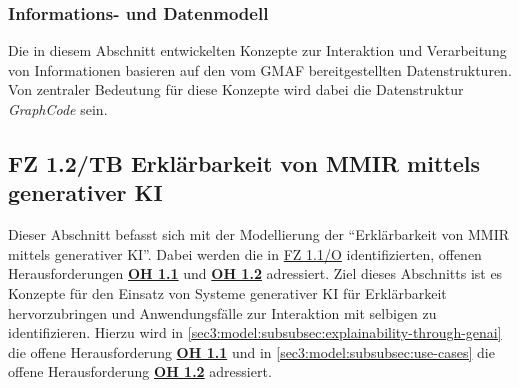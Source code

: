 \subsubsection{Informations- und Datenmodell}
Die in diesem Abschnitt entwickelten Konzepte zur Interaktion und Verarbeitung von Informationen basieren auf den vom GMAF bereitgestellten Datenstrukturen.
Von zentraler Bedeutung für diese Konzepte wird dabei die Datenstruktur \textit{GraphCode} sein.

\clearpage

\subsection[FZ 1.2/TB Erklärbarkeit von MMIR mittels generativer KI]{\texorpdfstring{FZ 1.2/TB Erklärbarkeit von MMIR mittels \\ generativer KI}{FZ 1.2/TB Erklärbarkeit von MMIR mittels generativer KI}}
\label{sec3:model:subsec:fz-explainability}
Dieser Abschnitt befasst sich mit der Modellierung der \enquote{Erklärbarkeit von MMIR mittels generativer KI}.
Dabei werden die in \hyperref[sec2:sota:subsec:fz-explainability]{FZ 1.1/O} identifizierten, offenen Herausforderungen \hyperref[sec2:sota:oi:1.1]{\textbf{OH 1.1}} und \hyperref[sec2:sota:oi:1.2]{\textbf{OH 1.2}} adressiert.
Ziel dieses Abschnitts ist es Konzepte für den Einsatz von Systeme generativer KI für Erklärbarkeit hervorzubringen und Anwendungsfälle zur Interaktion mit selbigen zu identifizieren.
Hierzu wird in \cref{sec3:model:subsubsec:explainability-through-genai} die offene Herausforderung \hyperref[sec2:sota:oi:1.1]{\textbf{OH 1.1}} und in \cref{sec3:model:subsubsec:use-cases} die offene Herausforderung \hyperref[sec2:sota:oi:1.2]{\textbf{OH 1.2}} adressiert.

